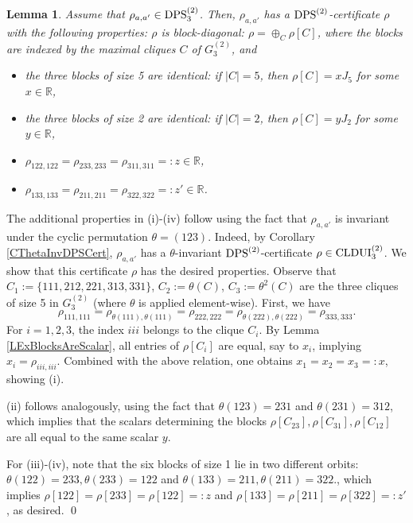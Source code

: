\documentclass[11pt]{article}
\makeatletter
\newcommand{\R}{\ensuremath{\mathbb{R}}}   %
\newcommand{\CLDUI}{\text{\rm CLDUI}}
\newcommand{\DPS}{\text{\rm DPS}}
\theoremstyle{plain}
\newtheorem{lemma}[satz]{Lemma}
\renewenvironment{proof}[1][\proofname]{%
  \par
  \pushQED{}%
  \normalfont
  \topsep6\p@\@plus6\p@
  \trivlist
  \item[\hskip\labelsep\itshape #1\@addpunct{.}]%
}{%
  \popQED
  \endtrivlist
}
\makeatother
\begin{document}
\begin{lemma}\label{temp4}
 Assume that $\rho_{a,a'}\in\DPS^{(2)}_3$. Then,  $\rho_{a,a'}$ has a $\DPS^{(2)}$-certificate $\rho$ with the following properties: $\rho$ is block-diagonal: $\rho=\oplus_C \rho[C]$, where the blocks are 
 indexed by the maximal cliques $C$ of $G^{(2)}_3$, and 
     \begin{itemize}
        \item [(i)] the three  blocks of size 5 are identical: if $|C|=5$, then $\rho[C]=xJ_5$  for some   $x\in\R$,
        \item [(ii)] the three blocks of size 2 are identical: if $|C|=2$, then $\rho[C]=y J_2$ for some  $y\in\R$,
        \item [(iii)] $\rho_{122,122}=\rho_{233,233}=\rho_{311,311}=:z\in\R$,
        \item [(iv)] $\rho_{133,133}=\rho_{211,211}=\rho_{322,322}=:z'\in\R$.
    \end{itemize}
\end{lemma}

\begin{proof}
 The additional properties in (i)-(iv) follow using the fact that $\rho_{a,a'}$ is invariant under the cyclic permutation $\theta=(123)$. Indeed, by  Corollary \ref{CThetaInvDPSCert}, $\rho_{a,a'}$ has  a  $\theta$-invariant $\DPS^{(2)}$-certificate $\rho\in \CLDUI^{(2)}_3$. We show that  this certificate $\rho$ has the desired properties. Observe that  $C_1:=\{111,212,221,313,331\}$, $C_2:=\theta(C)$, $C_3:=\theta^2(C)$ are the three cliques of size 5 in $G^{(2)}_{3}$ (where $\theta$ is applied element-wise).  
  First, we have $$\rho_{111,111}=\rho_{\theta(111),\theta(111)}=\rho_{222,222}=\rho_{\theta(222),\theta(222)}=\rho_{333,333}.$$
For $i=1,2,3$, the index $iii$ belongs to the clique $C_i$.  By  Lemma \ref{LExBlocksAreScalar}, all entries of $\rho[C_i]$ are equal, say to $x_i$, implying   $x_i=\rho_{iii,iii}$. Combined with the above relation, one obtains $x_1=x_2=x_3=:x$, showing (i).

    
  (ii) follows   analogously,    using the fact that  $\theta(123)=231$ and $\theta(231)=312$, which implies that the scalars determining the blocks $\rho[C_{23}], \rho[C_{31}],\rho[C_{12}]$ are all equal to the same scalar $y$. 
 
For (iii)-(iv),  note that the six blocks of size 1 lie in two different orbits: $\theta(122)=233,\theta(233)=122$ and  $\theta(133)=211,\theta(211)=322$., which implies $\rho[122]=\rho[233]=\rho[122]=:z$ and $\rho[133]=\rho[211]=\rho[322]=:z'$, as desired.
\qed\end{proof}
\end{document}
